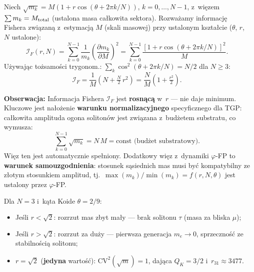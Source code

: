 \begin{proposition}%
\label{prop:T-equipartition-info}
Niech $\sqrt{m_k} = M(1 + r\cos(\theta + 2\pi k/N))$, $k = 0,\ldots,N{-}1$,
z~wi\k{e}zem $\sum m_k = M_{\rm total}$ (ustalona masa ca\l{}kowita sektora).
Rozwa\.zamy informacj\k{e} Fishera zwi\k{a}zan\k{a}
z~estymacj\k{a} $M$ (skali masowej) przy ustalonym kszta\l{}cie
($\theta$, $r$, $N$ ustalone):
\begin{equation}\label{eq:T-Fisher}
  \mathcal{I}_F(r, N)
  = \sum_{k=0}^{N-1}
    \frac{1}{m_k}\!\left(\frac{\partial m_k}{\partial M}\right)^{\!2}
  = \sum_{k=0}^{N-1}
    \frac{[1 + r\cos(\theta + 2\pi k/N)]^2}{M}.
\end{equation}
U\.zywaj\k{a}c to\.zsamo\'sci trygonom.:
$\sum_{k} \cos^2(\theta + 2\pi k/N) = N/2$ dla $N \ge 3$:
\begin{equation}
  \mathcal{I}_F = \frac{1}{M}\!\left(N + \tfrac{N}{2}\,r^2\right)
  = \frac{N}{M}\!\left(1 + \tfrac{r^2}{2}\right).
\end{equation}

\textbf{Obserwacja:} Informacja Fishera $\mathcal{I}_F$ jest
\textbf{rosn\k{a}c\k{a}} w~$r$ --- nie daje minimum.
Kluczowe jest na\l{}o\.zenie \textbf{warunku normalizacyjnego}
specyficznego dla TGP: ca\l{}kowita amplituda ogona soliton\'ow
jest zwi\k{a}zana z~bud\.zetem substratu, co wymusza:
\begin{equation}\label{eq:T-substrate-budget}
  \sum_{k=0}^{N-1} \sqrt{m_k} = N\,M = \text{const (bud\.zet substratowy)}.
\end{equation}
Wi\k{e}z ten jest automatycznie spe\l{}niony.
Dodatkowy wi\k{e}z z~dynamiki $\varphi$-FP to \textbf{warunek
samouzgodnienia}: stosunek s\k{a}siednich mas musi by\'c
kompatybilny ze z\l{}otym stosunkiem amplitud, tj.\
$\max(m_k)/\min(m_k) = f(r, N, \theta)$ jest ustalony
przez $\varphi$-FP.

Dla $N = 3$ i~k\k{a}ta Koide $\theta = 2/9$:
\begin{itemize}[nosep]
  \item Je\'sli $r < \sqrt{2}$: rozrzut mas zbyt ma\l{}y
    --- brak solitonu $\tau$ (masa za bliska $\mu$);
  \item Je\'sli $r > \sqrt{2}$: rozrzut za du\.zy
    --- pierwsza generacja $m_e \to 0$, sprzeczno\'s\'c
    ze stabilno\'sci\k{a} solitonu;
  \item $r = \sqrt{2}$ (\textbf{jedyna} warto\'s\'c):
    $\mathrm{CV}^2(\sqrt{m}) = 1$, daj\k{a}ca
    $Q_K = 3/2$ i~$r_{31} \approx 3477$.
\end{itemize}


\end{proposition}
